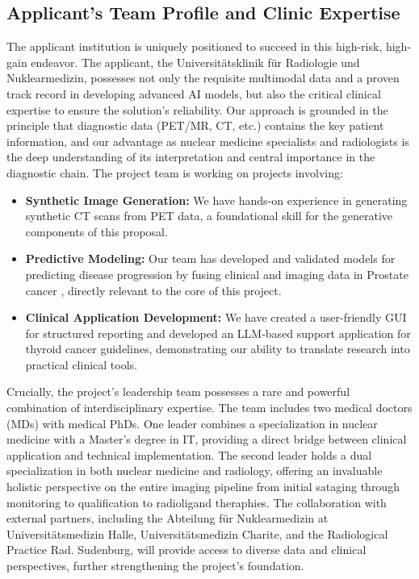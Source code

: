 \documentclass[11pt, a4paper]{article}
\begin{document}
\subsection{Applicant’s Team Profile and Clinic Expertise}
The applicant institution is uniquely positioned to succeed in this high-risk, high-gain endeavor. The applicant, the Universitätsklinik für Radiologie und Nuklearmedizin, possesses not only the requisite multimodal data and a proven track record in developing advanced AI models, but also the critical clinical expertise to ensure the solution's reliability. Our approach is grounded in the principle that diagnostic data (PET/MR, CT, etc.) contains the key patient information, and our advantage as nuclear medicine specialists and radiologists is the deep understanding of its interpretation and central importance in the diagnostic chain. The project team is working on projects involving:
\begin{itemize}
    \item \textbf{Synthetic Image Generation:} We have hands-on experience in generating synthetic CT scans from PET data, a foundational skill for the generative components of this proposal.
    \item \textbf{Predictive Modeling:} Our team has developed and validated models for predicting disease progression by fusing clinical and imaging data in Prostate cancer \cite{Wybranska_2025}, directly relevant to the core of this project.
    \item \textbf{Clinical Application Development:} We have created a user-friendly GUI for structured reporting and developed an LLM-based support application for thyroid cancer guidelines, demonstrating our ability to translate research into practical clinical tools.
\end{itemize}
Crucially, the project's leadership team possesses a rare and powerful combination of interdisciplinary expertise. The team includes two medical doctors (MDs) with medical PhDs. One leader combines a specialization in nuclear medicine with a Master's degree in IT, providing a direct bridge between clinical application and technical implementation. The second leader holds a dual specialization in both nuclear medicine and radiology, offering an invaluable holistic perspective on the entire imaging pipeline from initial sataging through monitoring to qualification to radioligand theraphies. The collaboration with external partners, including the Abteilung für Nuklearmedizin at Universitätsmedizin Halle, Universitätsmedizin Charite, and the Radiological Practice Rad. Sudenburg, will provide access to diverse data and clinical perspectives, further strengthening the project's foundation.
\end{document}
